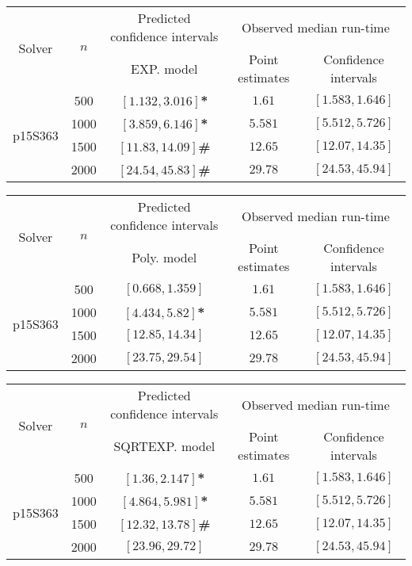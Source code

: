 \begin{tabular}{ccccc}
\hline 
\multirow{2}{*}{Solver} & \multirow{2}{*}{$n$} & Predicted confidence intervals & \multicolumn{2}{c}{Observed median run-time}\tabularnewline
 &  & EXP. model  & Point estimates  & Confidence intervals\tabularnewline
\hline 
\hline 
\multirow{4}{*}{p15S363} & 500 & $\mathbf{\left[1.132,3.016\right]}$\textbf{*} & $1.61$ & $\left[1.583,1.646\right]$ \tabularnewline 
 & 1000 & $\mathbf{\left[3.859,6.146\right]}$\textbf{*} & $5.581$ & $\left[5.512,5.726\right]$ \tabularnewline 
 & 1500 & $\mathbf{\left[11.83,14.09\right]}$\textbf{\#} & $12.65$ & $\left[12.07,14.35\right]$ \tabularnewline 
 & 2000 & $\mathbf{\left[24.54,45.83\right]}$\textbf{\#} & $29.78$ & $\left[24.53,45.94\right]$ \tabularnewline 
\hline 
\end{tabular} 

\begin{tabular}{ccccc}
\hline 
\multirow{2}{*}{Solver} & \multirow{2}{*}{$n$} & Predicted confidence intervals & \multicolumn{2}{c}{Observed median run-time}\tabularnewline
 &  & Poly. model  & Point estimates  & Confidence intervals\tabularnewline
\hline 
\hline 
\multirow{4}{*}{p15S363} & 500 & $\left[0.668,1.359\right]$ & $1.61$ & $\left[1.583,1.646\right]$ \tabularnewline 
 & 1000 & $\mathbf{\left[4.434,5.82\right]}$\textbf{*} & $5.581$ & $\left[5.512,5.726\right]$ \tabularnewline 
 & 1500 & $\mathbf{\left[12.85,14.34\right]}$ & $12.65$ & $\left[12.07,14.35\right]$ \tabularnewline 
 & 2000 & $\mathbf{\left[23.75,29.54\right]}$ & $29.78$ & $\left[24.53,45.94\right]$ \tabularnewline 
\hline 
\end{tabular} 

\begin{tabular}{ccccc}
\hline 
\multirow{2}{*}{Solver} & \multirow{2}{*}{$n$} & Predicted confidence intervals & \multicolumn{2}{c}{Observed median run-time}\tabularnewline
 &  & SQRTEXP. model  & Point estimates  & Confidence intervals\tabularnewline
\hline 
\hline 
\multirow{4}{*}{p15S363} & 500 & $\mathbf{\left[1.36,2.147\right]}$\textbf{*} & $1.61$ & $\left[1.583,1.646\right]$ \tabularnewline 
 & 1000 & $\mathbf{\left[4.864,5.981\right]}$\textbf{*} & $5.581$ & $\left[5.512,5.726\right]$ \tabularnewline 
 & 1500 & $\mathbf{\left[12.32,13.78\right]}$\textbf{\#} & $12.65$ & $\left[12.07,14.35\right]$ \tabularnewline 
 & 2000 & $\mathbf{\left[23.96,29.72\right]}$ & $29.78$ & $\left[24.53,45.94\right]$ \tabularnewline 
\hline 
\end{tabular} 


